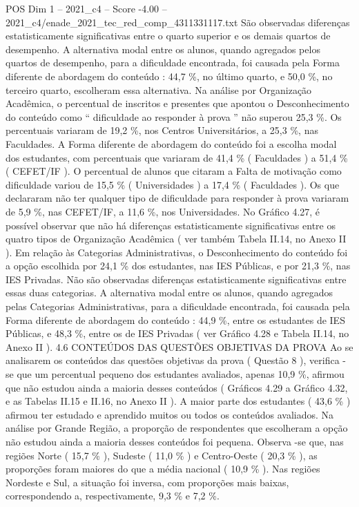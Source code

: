 \begin{textsample}{POS Dim 1 – 2021\_c4 – Score -4.00 – 2021\_c4/enade\_2021\_tec\_red\_comp\_4311331117.txt}
São observadas diferenças estatisticamente significativas entre o quarto superior e os demais quartos de desempenho.
A alternativa modal entre os alunos, quando agregados pelos quartos de desempenho, para a dificuldade encontrada, foi causada pela Forma diferente de abordagem do conteúdo : 44,7 \%, no último quarto, e 50,0 \%, no terceiro quarto, escolheram essa alternativa.
Na análise por Organização Acadêmica, o percentual de inscritos e presentes que apontou o Desconhecimento do conteúdo como “ dificuldade ao responder à prova ” não superou 25,3 \%.
Os percentuais variaram de 19,2 \%, nos Centros Universitários, a 25,3 \%, nas Faculdades.
A Forma diferente de abordagem do conteúdo foi a escolha modal dos estudantes, com percentuais que variaram de 41,4 \% ( Faculdades ) a 51,4 \% ( CEFET/IF ).
O percentual de alunos que citaram a Falta de motivação como dificuldade variou de 15,5 \% ( Universidades ) a 17,4 \% ( Faculdades ).
Os que declararam não ter qualquer tipo de dificuldade para responder à prova variaram de 5,9 \%, nas CEFET/IF, a 11,6 \%, nos Universidades.
No Gráfico 4.27, é possível observar que não há diferenças estatisticamente significativas entre os quatro tipos de Organização Acadêmica ( ver também Tabela II.14, no Anexo II ).
Em relação às Categorias Administrativas, o Desconhecimento do conteúdo foi a opção escolhida por 24,1 \% dos estudantes, nas IES Públicas, e por 21,3 \%, nas IES Privadas.
Não são observadas diferenças estatisticamente significativas entre essas duas categorias.
A alternativa modal entre os alunos, quando agregados pelas Categorias Administrativas, para a dificuldade encontrada, foi causada pela Forma diferente de abordagem do conteúdo : 44,9 \%, entre os estudantes de IES Públicas, e 48,3 \%, entre os de IES Privadas ( ver Gráfico 4.28 e Tabela II.14, no Anexo II ). 4.6 CONTEÚDOS DAS QUESTÕES OBJETIVAS DA PROVA Ao se analisarem os conteúdos das questões objetivas da prova ( Questão 8 ), verifica -se que um percentual pequeno dos estudantes avaliados, apenas 10,9 \%, afirmou que não estudou ainda a maioria desses conteúdos ( Gráficos 4.29 a Gráfico 4.32, e as Tabelas II.15 e II.16, no Anexo II ).
A maior parte dos estudantes ( 43,6 \% ) afirmou ter estudado e aprendido muitos ou todos os conteúdos avaliados.
Na análise por Grande Região, a proporção de respondentes que escolheram a opção não estudou ainda a maioria desses conteúdos foi pequena.
Observa -se que, nas regiões Norte ( 15,7 \% ), Sudeste ( 11,0 \% ) e Centro-Oeste ( 20,3 \% ), as proporções foram maiores do que a média nacional ( 10,9 \% ).
Nas regiões Nordeste e Sul, a situação foi inversa, com proporções mais baixas, correspondendo a, respectivamente, 9,3 \% e 7,2 \%.

\end{textsample}
